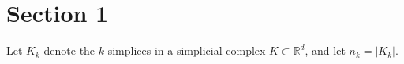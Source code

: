 \documentclass[a4paper, 11pt]{article}
\newcommand{\R}{\mathbb{R}}
\begin{document}
\section{Section 1}
Let $K_k$ denote the $k$-simplices in a simplicial complex $K \subset \R^d$, and
let $n_k = |K_k|$.
\end{document}
